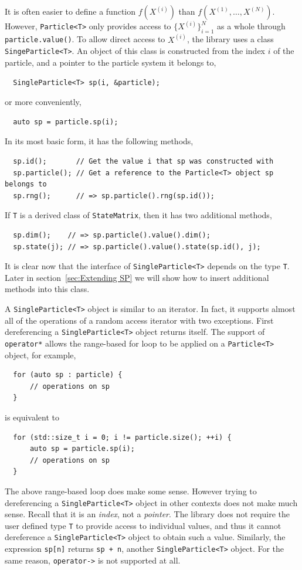 It is often easier to define a function $f(X^{(i)})$ than
$f(X^{(1)},\dots,X^{(N)})$. However, \verb|Particle<T>| only provides access to
$\{X^{(i)}\}_{i=1}^N$ as a whole through \verb|particle.value()|. To allow
direct access to $X^{(i)}$, the library uses a class \verb|SingeParticle<T>|.
An object of this class is constructed from the index $i$ of the particle, and
a pointer to the particle system it belongs to,
\begin{Verbatim}
  SingleParticle<T> sp(i, &particle);
\end{Verbatim}
or more conveniently,
\begin{Verbatim}
  auto sp = particle.sp(i);
\end{Verbatim}
In its most basic form, it has the following methods,
\begin{Verbatim}
  sp.id();       // Get the value i that sp was constructed with
  sp.particle(); // Get a reference to the Particle<T> object sp belongs to
  sp.rng();      // => sp.particle().rng(sp.id());
\end{Verbatim}
If \verb|T| is a derived class of \verb|StateMatrix|, then it has two
additional methods,
\begin{Verbatim}
  sp.dim();    // => sp.particle().value().dim();
  sp.state(j); // => sp.particle().value().state(sp.id(), j);
\end{Verbatim}
It is clear now that the interface of \verb|SingleParticle<T>| depends on the
type \verb|T|. Later in section~\ref{sec:Extending SP} we will show how to
insert additional methods into this class.

A \verb|SingleParticle<T>| object is similar to an iterator. In fact, it
supports almost all of the operations of a random access iterator with two
exceptions. First dereferencing a \verb|SingleParticle<T>| object returns
itself. The support of \verb|operator*| allows the range-based for loop to be
applied on a \verb|Particle<T>| object, for example,
\begin{Verbatim}
  for (auto sp : particle) {
      // operations on sp
  }
\end{Verbatim}
is equivalent to
\begin{Verbatim}
  for (std::size_t i = 0; i != particle.size(); ++i) {
      auto sp = particle.sp(i);
      // operations on sp
  }
\end{Verbatim}
The above range-based loop does make some sense. However trying to
dereferencing a \verb|SingleParticle<T>| object in other contexts does not make
much sense. Recall that it is an \emph{index}, not a \emph{pointer}. The
library does not require the user defined type \verb|T| to provide access to
individual values, and thus it cannot dereference a \verb|SingleParticle<T>|
object to obtain such a value. Similarly, the expression \verb|sp[n]| returns
\verb|sp + n|, another \verb|SingleParticle<T>| object. For the same reason,
\verb|operator->| is not supported at all.

